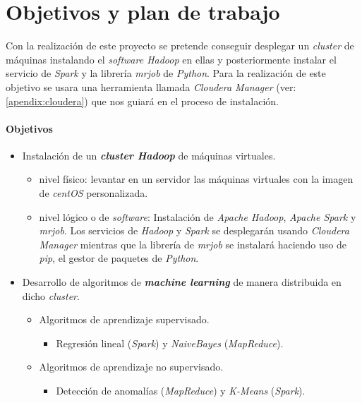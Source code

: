 
\chapter*{Objetivos y plan de trabajo}\label{objetivos_plan_trabajo}
Con la realización de este proyecto se pretende conseguir desplegar un \textit{cluster} de máquinas instalando el
\textit{software Hadoop} en ellas y posteriormente instalar el servicio de \textit{Spark} y la librería \textit{mrjob}
de \textit{Python}. Para la realización de este objetivo se usara una herramienta llamada \textit{Cloudera Manager} 
(ver: \autoref{apendix:cloudera}) que nos guiará en el proceso de instalación.
\newline

\subsubsection*{Objetivos}
\begin{itemize}
  \item Instalación de un \textbf{\textit{cluster Hadoop}} de máquinas virtuales.
  \begin{itemize}
    \item nivel físico: levantar en un servidor las máquinas virtuales con la imagen de \textit{centOS} personalizada.
    \item nivel lógico o de \textit{software}: Instalación de \textit{Apache Hadoop}, \textit{Apache Spark} 
          y \textit{mrjob}. Los servicios de \textit{Hadoop} y \textit{Spark} se desplegarán usando 
          \textit{Cloudera Manager} mientras que la librería de \textit{mrjob} se instalará haciendo uso de 
          \textit{pip}, el gestor de paquetes de \textit{Python}.
  \end{itemize}
  \item Desarrollo de algoritmos de \textbf{\textit{machine learning}} de manera distribuida en dicho \textit{cluster}.
  \begin{itemize}
    \item Algoritmos de aprendizaje supervisado.
    \begin{itemize}
      \item Regresión lineal (\textit{Spark}) y \textit{NaiveBayes} (\textit{MapReduce}).
    \end{itemize}
    \item Algoritmos de aprendizaje no supervisado.
    \begin{itemize}
      \item Detección de anomalías (\textit{MapReduce}) y \textit{K-Means} (\textit{Spark}).
    \end{itemize}
  \end{itemize}
\end{itemize}

